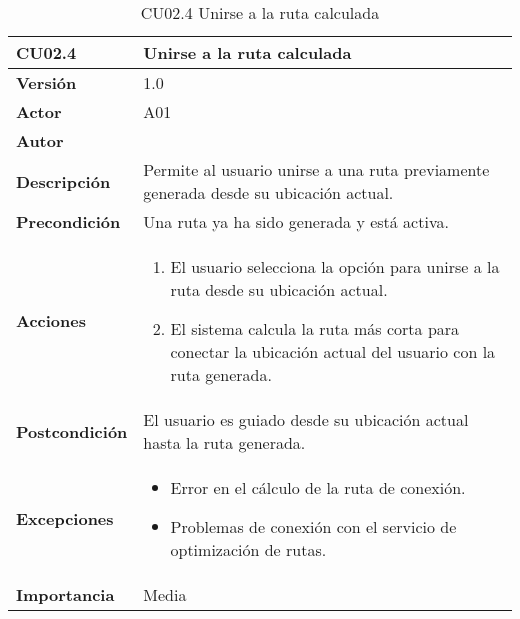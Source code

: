 \begin{table}[p]
	\centering
	\begin{tabularx}{\linewidth}{ p{} p{} }
		\toprule
		\textbf{CU02.4}    & \textbf{Unirse a la ruta calculada} \\
		\toprule
		\textbf{Versión}              & 1.0    \\
		\textbf{Actor}                & A01 \\
		\textbf{Autor}                & \autor \\
		\textbf{Descripción}          & Permite al usuario unirse a una ruta previamente generada desde su ubicación actual. \\
		\textbf{Precondición}         & Una ruta ya ha sido generada y está activa. \\
		\textbf{Acciones}             &
		\begin{enumerate}
			\def\labelenumi{\arabic{enumi}.}
			\tightlist
			\item El usuario selecciona la opción para unirse a la ruta desde su ubicación actual.
			\item El sistema calcula la ruta más corta para conectar la ubicación actual del usuario con la ruta generada.
		\end{enumerate}\\
		\textbf{Postcondición}        & El usuario es guiado desde su ubicación actual hasta la ruta generada. \\
		\textbf{Excepciones}          & 
		\begin{itemize}
			\tightlist
			\item Error en el cálculo de la ruta de conexión.
			\item Problemas de conexión con el servicio de optimización de rutas.
		\end{itemize}\\
		\textbf{Importancia}          & Media \\
		\bottomrule
	\end{tabularx}
	\caption{CU02.4 Unirse a la ruta calculada}
\end{table}

